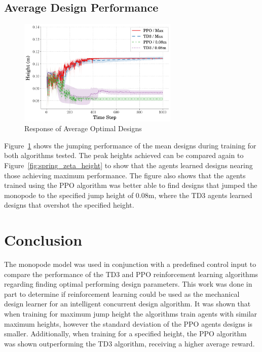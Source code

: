 \documentclass[10pt,twocolumn,letterpaper]{article}
\begin{document}
\subsection{Average Design Performance}
%
\begin{figure}[tb]
        \begin{center}
                \includegraphics[width = 3in]{figures/ppo_vs_td3/avg_height_comp.png}
                \caption{Response of Average Optimal Designs}
                \label{fig:height_vs_time}
        \end{center}
\end{figure}

Figure~\ref{fig:height_vs_time} shows the jumping performance of the mean designs during training for both algorithms tested. The peak heights achieved can be compared again to Figure~\ref{fig:spring_zeta_height} to show that the agents learned designs nearing those achieving maximum performance. The figure also shows that the agents trained using the PPO algorithm was better able to find designs that jumped the monopode to the specified jump height of 0.08m, where the TD3 agents learned designs that overshot the specified height.


\section{Conclusion}
\label{sec:conclusion}
The monopode model was used in conjunction with a predefined control input to compare the performance of the TD3 and PPO reinforcement learning algorithms regarding finding optimal performing design parameters. This work was done in part to determine if reinforcement learning could be used as the mechanical design learner for an intelligent concurrent design algorithm. It was shown that when training for maximum jump height the algorithms train agents with similar maximum heights, however the standard deviation of the PPO agents designs is smaller. Additionally, when training for a specified height, the PPO algorithm was shown outperforming the TD3 algorithm, receiving a higher average reward.
\end{document}
